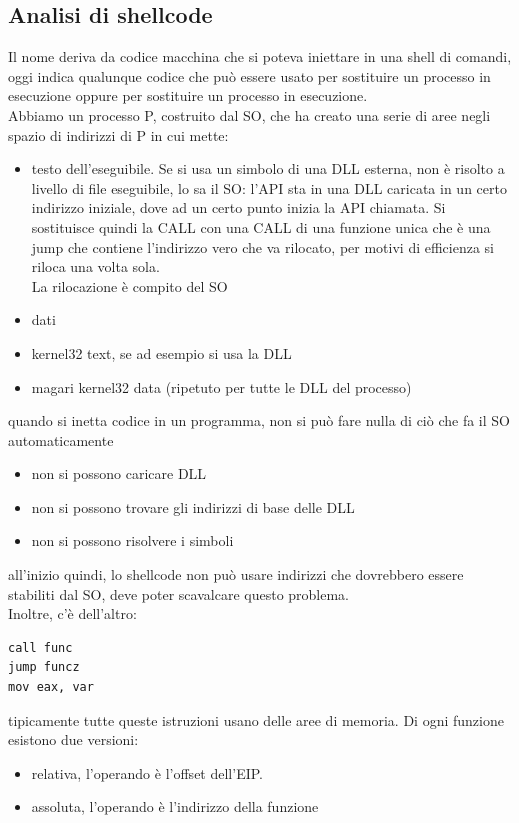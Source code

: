 \documentclass[12pt, oneside]{extbook}
\begin{document}
\subsection{Analisi di shellcode}
Il nome deriva da codice macchina che si poteva iniettare in una shell di comandi, oggi indica qualunque codice che può essere usato per sostituire un processo in esecuzione oppure per sostituire un processo in esecuzione.\\Abbiamo un processo P, costruito dal SO, che ha creato una serie di aree negli spazio di indirizzi di P in cui mette:
\begin{itemize}
	\item testo dell'eseguibile. Se si usa un simbolo di una DLL esterna, non è risolto a livello di file eseguibile, lo sa il SO: l'API sta in una DLL caricata in un certo indirizzo iniziale, dove ad un certo punto inizia la API chiamata. Si sostituisce quindi la CALL con una CALL di una funzione unica che è una jump che contiene l'indirizzo vero che va rilocato, per motivi di efficienza si riloca una volta sola.\\La rilocazione è compito del SO
	\item dati
	\item kernel32 text, se ad esempio si usa la DLL
	\item magari kernel32 data (ripetuto per tutte le DLL del processo)
\end{itemize}
quando si inetta codice in un programma, non si può fare nulla di ciò che fa il SO automaticamente
\begin{itemize}
	\item non si possono caricare DLL
	\item non si possono trovare gli indirizzi di base delle DLL
	\item non si possono risolvere i simboli
\end{itemize}
all'inizio quindi, lo shellcode non può usare indirizzi che dovrebbero essere stabiliti dal SO, deve poter scavalcare questo problema.\\Inoltre, c'è dell'altro:
\begin{lstlisting}
call func
jump funcz
mov eax, var
\end{lstlisting}
tipicamente tutte queste istruzioni usano delle aree di memoria. Di ogni funzione esistono due versioni:
\begin{itemize}
	\item relativa, l'operando  è l'offset dell'EIP.
	\item assoluta, l'operando è l'indirizzo della funzione
\end{itemize}
\end{document}

